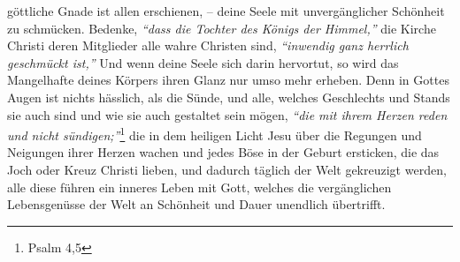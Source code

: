 göttliche Gnade
ist allen erschienen, -- deine Seele mit unvergänglicher Schönheit zu schmücken.
Bedenke, \textit{"`dass die Tochter des Königs der Himmel,"'} die Kirche Christi
 deren
 Mitglieder alle wahre
Christen
sind, \textit{"`inwendig ganz herrlich geschmückt ist,"'}
Und wenn deine Seele sich darin hervortut, so wird das Mangelhafte deines
Körpers ihren Glanz nur umso mehr erheben. Denn in Gottes Augen ist nichts
hässlich, als die Sünde, und alle, welches Geschlechts und Stands
sie auch
sind und wie sie auch gestaltet sein mögen,
\textit{"`die mit ihrem Herzen reden und
nicht sündigen;"'}\footnote{Psalm 4,5}
die in dem heiligen Licht Jesu über die
Regungen und Neigungen ihrer Herzen wachen und jedes Böse in der Geburt
ersticken, die das Joch oder Kreuz Christi  lieben, und dadurch
täglich der Welt
gekreuzigt werden, alle diese führen ein inneres Leben
mit
Gott, welches die
vergänglichen Lebensgenüsse der Welt an Schönheit und Dauer unendlich
übertrifft.



